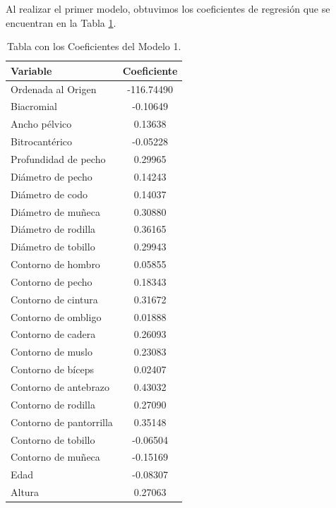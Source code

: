 \documentclass{article} %
\begin{document}
Al realizar el primer modelo, obtuvimos los coeficientes de regresión que se encuentran en la Tabla \ref{tab:table-punto-1-3-a}.


\begin{table}[H]
	\centering
		\begin{tabular}{||l | c ||}
			\hline
			\hline
			Variable & Coeficiente \\
			\hline			
			\hline
			Ordenada al Origen & -116.74490  \\
			\hline
			Biacromial & -0.10649\\
			\hline
			Ancho pélvico &  0.13638\\
			\hline
			Bitrocantérico & -0.05228\\
			\hline
			Profundidad de pecho & 0.29965\\
			\hline
			Diámetro de pecho &  0.14243\\
			\hline
			Diámetro de codo & 0.14037\\
			\hline
			Diámetro de muñeca & 0.30880\\
			\hline
			Diámetro de rodilla &  0.36165\\
			\hline
			Diámetro de tobillo & 0.29943\\
			\hline
			Contorno de hombro & 0.05855\\
			\hline
			Contorno de pecho &  0.18343\\
			\hline
			Contorno de cintura & 0.31672\\
			\hline
			Contorno de ombligo & 0.01888\\
			\hline
			Contorno de cadera &  0.26093\\
			\hline
			Contorno de muslo & 0.23083\\
			\hline
			Contorno de bíceps & 0.02407\\
			\hline
			Contorno de antebrazo &  0.43032\\
			\hline
			Contorno de rodilla & 0.27090\\
			\hline
			Contorno de pantorrilla & 0.35148\\
			\hline
			Contorno de tobillo &  -0.06504\\
			\hline
			Contorno de muñeca & -0.15169\\
			\hline
			Edad & -0.08307\\
			\hline
			Altura & 0.27063\\
			\hline
			\hline
		\end{tabular}
		\caption{Tabla con los Coeficientes del Modelo 1.}
	\label{tab:table-punto-1-3-a}
\end{table}
\end{document}
